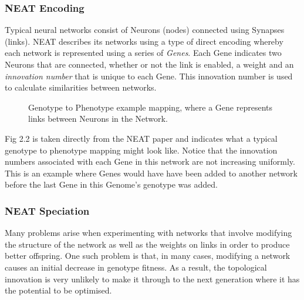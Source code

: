 \documentclass[]{Learning-to-Play-Wolfenstein-thesis}
\begin{document}
\subsubsection{NEAT Encoding}
Typical neural networks consist of Neurons (nodes) connected using Synapses (links). NEAT describes its networks using a type of direct encoding whereby each network is represented using a series of \textit{Genes}. Each Gene indicates two Neurons that are connected, whether or not the link is enabled, a weight and an \textit{innovation number} that is unique to each Gene. This innovation number is used to calculate similarities between networks.

\begin{figure}[h]
\centering
\fboxsep 2mm
\caption{\label{fig:NEAT_encoding} Genotype to Phenotype example mapping, where a Gene represents links between Neurons in the Network.}
\end{figure} 
Fig 2.2 is taken directly from the NEAT paper and indicates what a typical genotype to phenotype mapping might look like. Notice that the innovation numbers associated with each Gene in this network are not increasing uniformly. This is an example where Genes would have have been added to another network before the last Gene in this Genome's genotype was added.~\cite{NEAT:encoding}

\subsubsection{\label{subsection2.3.1}NEAT Speciation}
Many problems arise when experimenting with networks that involve modifying the structure of the network as well as the weights on links in order to produce better offspring. One such problem is that, in many cases, modifying a network causes an initial decrease in genotype fitness. As a result, the topological innovation is very unlikely to make it through to the next generation where it has the potential to be optimised. 
\end{document}
